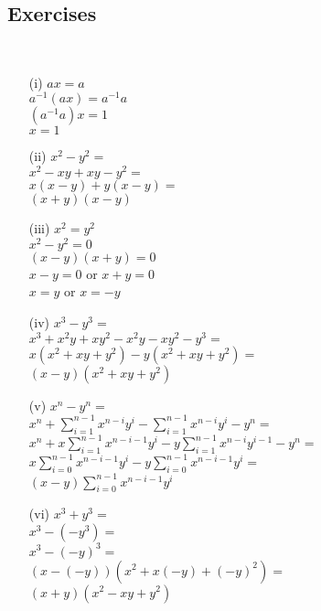 \subsection{Exercises}
\begin{problem}[1-1] \ 
\begin{enumerate}
\item[(i)]
$ax = a$ \\
$a^{-1}(ax) = a^{-1}a$ \\
$(a^{-1}a)x = 1$ \\
$x = 1$ 

\item[(ii)]
$x^2 - y^2 =$ \\
$x^2 - xy + xy - y^2 =$ \\
$x(x - y) + y(x - y) =$ \\
$(x + y)(x - y)$ 

\item[(iii)]
$x^2 = y^2$ \\
$x^2 - y^2 = 0$ \\
$(x - y)(x + y) = 0$ \\
$x - y = 0$ or $x + y = 0$ \\
$x = y$ or $x = -y$

\item[(iv)]
$x^3 - y^3 =$ \\
$x^3 + x^2y + xy^2 - x^2y - xy^2 - y^3 =$ \\
$x(x^2 + xy + y^2) -y(x^2 + xy + y^2) = $ \\
$(x - y)(x^2 + xy + y^2)$

\item[(v)]
$x^n - y^n =$ \\
$x^n + \sum_{i=1}^{n-1} x^{n-i}y^i - \sum_{i=1}^{n-1} x^{n-i}y^i - y^n =$ \\
$x^n + x\sum_{i=1}^{n-1} x^{n-i-1}y^i - y\sum_{i=1}^{n-1} x^{n-i}y^{i-1} - y^n =$ \\
$x\sum_{i=0}^{n-1} x^{n-i-1}y^i -y\sum_{i=0}^{n-1} x^{n-i-1}y^i =$\\
$(x - y)\sum_{i=0}^{n-1} x^{n-i-1}y^i$

\item[(vi)]
$x^3 + y^3 =$ \\
$x^3 - (-y^3) =$ \\
$x^3 - (-y)^3 =$ \\
$(x - (-y))(x^2 + x(-y) + (-y)^2) = $\\
$(x + y)(x^2 - xy + y^2)$
\end{enumerate}
\end{problem}

